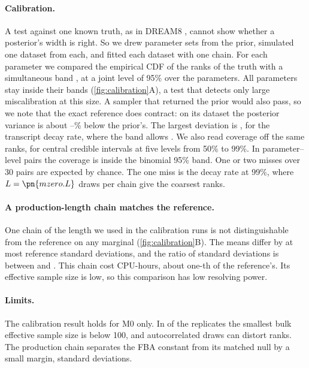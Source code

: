 \paragraph{Calibration.} A test against one known truth, as in DREAM8
\cite{karr2015summary}, cannot show whether a posterior's width is right. So we drew
 parameter sets from the prior,
simulated one dataset from each, and fitted each dataset with one chain. For each
parameter we compared the empirical CDF of the ranks of the truth with a
simultaneous band \cite{sailynoja2022graphical}, at a joint level of 95\% over the
 parameters. All  parameters stay inside their bands (\cref{fig:calibration}A), a test that detects only large miscalibration at this size. A sampler that returned the prior would also pass, so we note that the exact reference does contract: on its dataset the posterior variance is about --\% below the prior's. The largest deviation is , for the
transcript decay rate, where the band allows . We also read coverage off the same ranks, for central credible intervals at five
levels from 50\% to 99\%. In  parameter--level pairs the coverage is
inside the binomial 95\% band. One or two misses over 30 pairs are expected by chance.
The one miss is the decay rate at 99\%, where $L = \pn{mzero.L}$ draws per chain give
the coarsest ranks.

\paragraph{A production-length chain matches the reference.} One chain of the
length we used in the calibration runs is not distinguishable from the reference on
any marginal (\cref{fig:calibration}B). The means differ by at most
 reference standard deviations, and the ratio of standard deviations
is between  and . This chain cost 
CPU-hours, about one-th of the reference's. Its effective sample size is low, so this comparison has low resolving power.

\paragraph{Limits.} The calibration result holds for M0 only. In 
of the  replicates the smallest bulk effective sample size is below 100, and autocorrelated draws can distort ranks.
The production chain separates the FBA constant from its matched null by a small
margin,  standard deviations.

